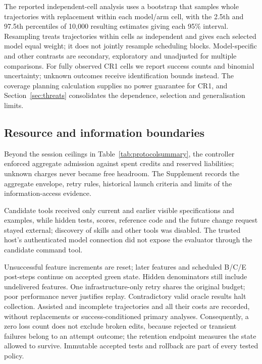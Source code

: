 The reported independent-cell analysis uses a bootstrap that samples whole trajectories with replacement within each model/arm cell, with the 2.5th and 97.5th percentiles of 10,000 resulting estimates giving each
95\% interval. Resampling treats trajectories within cells as independent and gives each
selected model equal weight; it does not jointly resample scheduling blocks.
Model-specific and other contrasts are secondary, exploratory and
unadjusted for multiple comparisons. For fully observed CR1 cells we report
success counts and binomial uncertainty; unknown outcomes receive
identification bounds instead. The coverage planning calculation supplies no power guarantee for CR1, and Section~\ref{sec:threats} consolidates the
dependence, selection and generalisation limits.

\subsection{Resource and information boundaries}\label{sec:prerun}

Beyond the session ceilings in Table~\ref{tab:protocolsummary}, the controller enforced aggregate admission against spent credits and
reserved liabilities; unknown charges never became free headroom.
The Supplement records the aggregate envelope, retry rules, historical
launch criteria and limits of the information-access evidence.

Candidate tools received only current and earlier visible specifications and examples, while hidden tests, scores, reference code and the future change request stayed external; discovery of skills and other tools was disabled. The trusted host's authenticated model connection did not expose
the evaluator through the candidate command tool.

Unsuccessful feature increments are reset; later features and scheduled
B/C/E post-steps continue on accepted green state. Hidden denominators
still include undelivered features. One infrastructure-only retry shares
the original budget; poor performance never justifies replay.
Contradictory valid oracle results halt collection.
Assisted and incomplete trajectories and all their costs are recorded,
without replacements or success-conditioned primary analyses.
Consequently, a zero loss count does not exclude broken edits, because rejected or transient failures belong to an attempt outcome; the retention endpoint measures the state allowed to survive.
Immutable accepted tests and rollback are part of every tested policy.

